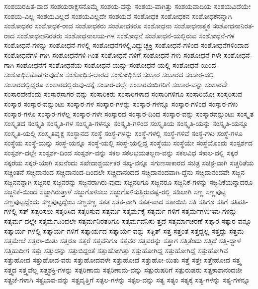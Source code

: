 {ಸಂಶಯರಹಿತ-ವಾದ
ಸಂಶಯರಾಕ್ಷಸನೊಮ್ಮೆ
ಸಂಶಯ-ವನ್ನು
ಸಂಶಯ-ವಾಗಿತ್ತು
ಸಂಶಯವಾದಿಯ
ಸಂಶಯವಿದೆಯೇ
ಸಂಶಯ-ವಿಲ್ಲ
ಸಂಶಯವಿಲ್ಲದೆ
ಸಂಶಯವಿಲ್ಲದೇ
ಸಂಶಯವೆ
ಸಂಶೋಧಕ
ಸಂಶೋಧಕನ
ಸಂಶೋಧಕನನ್ನಾಗಿ
ಸಂಶೋಧಕರ
ಸಂಶೋಧಕ-ರಾದ
ಸಂಶೋಧಕರು
ಸಂಶೋಧಕರೂ
ಸಂಶೋಧನಾ
ಸಂಶೋಧನಾತ್ಮಕ
ಸಂಶೋಧನಾನಿರತ-ರಾದ
ಸಂಶೋಧನಾನಿರತರು
ಸಂಶೋಧನಾಲಯ-ಗಳ
ಸಂಶೋಧನೆ
ಸಂಶೋಧನೆ-ಯಲ್ಲಿರುವ
ಸಂಶೋಧನೆ-ಗಳ
ಸಂಶೋಧನೆ-ಗಳನ್ನು
ಸಂಶೋಧನೆ-ಗಳಲ್ಲಿ
ಸಂಶೋಧನೆಗಳಲ್ಲಿವಿದ್ಯುಚ್ಛಕ್ತಿ
ಸಂಶೋಧನೆ-ಗಳಿಂದ
ಸಂಶೋಧನೆಗಳಿಂದಾದ
ಸಂಶೋಧನೆಗಳಿ-ಗಾಗಿ
ಸಂಶೋಧನೆಗಳಿ-ಗಿಂತ
ಸಂಶೋಧನೆ-ಗಳಿಗೆ
ಸಂಶೋಧನೆ-ಗಳು
ಸಂಶೋಧನೆ-ಗಳೇ
ಸಂಶೋಧನೆ-ಗಾಗಿ
ಸಂಶೋಧನೆಗೆ
ಸಂಶೋಧನೆಯ
ಸಂಶೋಧನೆ-ಯನ್ನು
ಸಂಶೋಧನೆ-ಯಲ್ಲಿ
ಸಂಶೋಧನೆ-ಯಿಂದ
ಸಂಶೋಧಿಸತೊಡಗುವುದೊ
ಸಂಶೋಧಿಸ-ಲಾರದ
ಸಂಶೋಧಿಸಿದ
ಸಂಸಾರ
ಸಂಸಾರದ
ಸಂಸಾರ-ದಲ್ಲಿ
ಸಂಸಾರದಲ್ಲಿದ್ದರೂ
ಸಂಸಾರದಲ್ಲಿರುವು-ದಕ್ಕೆ
ಸಂಸಾರ-ದಲ್ಲೇ
ಸಂಸಾರವಂದಿಗರಿಗೆ
ಸಂಸಾರ-ವನ್ನು
ಸಂಸಾರವೇ
ಸಂಸಾರವೇನೆಂದು
ಸಂಸಾರಸಾಗರ-ವನ್ನು
ಸಂಸಾರಿಕರು
ಸಂಸಾರಿಗಳಾದ
ಸಂಸಾರಿಗಳಿಗೂ
ಸಂಸಾರಿಯೋ
ಸಂಸ್ಕರಿಸುವ
ಸಂಸ್ಕಾರ
ಸಂಸ್ಕಾರ-ವನ್ನುಂಟು
ಸಂಸ್ಕಾರ-ಗಳ
ಸಂಸ್ಕಾರ-ಗಳನ್ನು
ಸಂಸ್ಕಾರ-ಗಳನ್ನೂ
ಸಂಸ್ಕಾರ-ಗಳಿಂದ
ಸಂಸ್ಕಾರ-ಗಳು
ಸಂಸ್ಕಾರ-ಗಳೂ
ಸಂಸ್ಕಾರ-ಗಳೆಲ್ಲ
ಸಂಸ್ಕಾರ-ಗಳೇ
ಸಂಸ್ಕಾರದ
ಸಂಸ್ಕಾರ-ದಿಂದ
ಸಂಸ್ಕಾರ-ವನ್ನು
ಸಂಸ್ಕಾರವನ್ನುಂಟು
ಸಂಸ್ಕೃತ
ಸಂಸ್ಕೃತದ
ಸಂಸ್ಕೃತಿ
ಸಂಸ್ಕೃತಿ-ಗಳ
ಸಂಸ್ಕೃತಿ-ಗಳನ್ನೂ
ಸಂಸ್ಕೃತಿ-ಗಳಿಂದ
ಸಂಸ್ಕೃತಿಯ
ಸಂಸ್ಕೃತಿ-ಯನ್ನು
ಸಂಸ್ಕೃತಿ-ಯನ್ನೂ
ಸಂಸ್ಕೃತಿ-ಯಲ್ಲಿ
ಸಂಸ್ಕೃತಿವೃಕ್ಷ
ಸಂಸ್ಥಾನದ
ಸಂಸ್ಥೆ
ಸಂಸ್ಥೆ-ಗಳನ್ನು
ಸಂಸ್ಥೆ-ಗಳಲ್ಲಿ
ಸಂಸ್ಥೆ-ಗಳಿವೆ
ಸಂಸ್ಥೆ-ಗಳು
ಸಂಸ್ಥೆ-ಗಳೂ
ಸಂಸ್ಥೆಯ
ಸಂಸ್ಥೆ-ಯನ್ನು
ಸಂಸ್ಥೆ-ಯನ್ನೂ
ಸಂಸ್ಥೆ-ಯಲ್ಲಿ
ಸಂಸ್ಥೆ-ಯಲ್ಲಿದ್ದ
ಸಂಸ್ಥೆಯು
ಸಂಸ್ಥೆಯೇ
ಸಂಸ್ಥೆಯೊಂದು
ಸಂಸ್ಪರ್ಶದ
ಸಂಸ್ಪರ್ಶ-ದಲ್ಲೇ
ಸಂಸ್ಪರ್ಶ-ದಿಂದ
ಸಂಸ್ಪರ್ಶ-ವನ್ನು
ಸಕಲ
ಸಕಲಭಯತಲ್ಲಣ-ವನ್ನು
ಸಕಲವಿಧ
ಸಕಾಲ-ದಲ್ಲಿ
ಸಕ್ಕರೆ
ಸಕ್ಕರೆಯ
ಸಕ್ಕರೆ-ಯಾಗಿ
ಸಖನೆಂದು
ಸಖೇದಾಶ್ಚರ್ಯಕರ
ಸಖ್ಯ-ವನ್ನೂ
ಸಗುಣಸಾಕಾರದ
ಸಚಿತ್ರ
ಸಚಿತ್ರ-ವಾಗಿ
ಸಚ್ಚರಿತೆಯ
ಸಚ್ಚಿಂತನೆ
ಸಚ್ಚಿದಾನಂದ
ಸಚ್ಚಿದಾನಂದ-ದಿಂದಲೇ
ಸಚ್ಚಿದಾನಂದದ
ಸಚ್ಚಿದಾನಂದವಾಗಿ-ದ್ದೆನು
ಸಚ್ಚಿದಾನಂದವೇ
ಸಜ್ಜನ
ಸಜ್ಜನನನ್ನಾಗಿ
ಸಜ್ಜನರ
ಸಜ್ಜನರನ್ನು
ಸಜ್ಜನರಾಗಿರು-ವುದು
ಸಜ್ಜನರಿಗೂ
ಸಜ್ಜನರೂ
ಸಜ್ಜನಿಕೆ-ಗಳನ್ನು
ಸಜ್ಜನಿಕೆಯನ್ನಾದರೂ
ಸಜ್ಜನಿಕೆ-ಯಿಂದ
ಸಜ್ಜಾಗಿರುತ್ತಾಳೆ
ಸಜ್ಜುಗೊಳಿಸಲು
ಸಜ್ಜುಗೊಳಿಸುತ್ತಿರುವಷ್ಟ-ರಲ್ಲಿ
ಸಡಿಲಾಗಿ
ಸಣ್ಣ
ಸಣ್ಣಪುಟ್ಟ
ಸಣ್ಣಪುಟ್ಟದ್ದೆಂದು
ಸಣ್ಣಪುಟ್ಟದ್ದೆಂಬ
ಸಣ್ಣಸಣ್ಣ
ಸತತ
ಸತತ-ವಾಗಿ
ಸತತ-ವಾದ
ಸತಾಯಿಸಿ
ಸತಿ
ಸತಿಗೂ
ಸತಿಗೆ
ಸತಿಪತಿ-ಗಳಲ್ಲಿ
ಸತ್
ಸತ್ಕರಿಸಲು
ಸತ್ಕರಿಸಿದ
ಸತ್ಕರಿಸುವ
ಸತ್ಕರ್ಮ
ಸತ್ಕರ್ಮಕ್ಕೆ
ಸತ್ಕರ್ಮ-ಗಳಿಗೆ
ಸತ್ಕರ್ಮಗಳುಇವು-ಗಳನ್ನು
ಸತ್ಕರ್ಮ-ದಲ್ಲೇ
ಸತ್ಕರ್ಮದಿಂದಲೇ
ಸತ್ಕರ್ಮನಿರತರಿಗೂ
ಸತ್ಕರ್ಮವೆನಿಸು-ತ್ತದೆ
ಸತ್ಕರ್ಮಾಚರಣೆ
ಸತ್ಕಾರ
ಸತ್ಕಾರ-ವನ್ನೂ
ಸತ್ಕಾರ್ಯ-ಗಳಲ್ಲಿ
ಸತ್ಕಾರ್ಯ-ಗಳಿಗೆ
ಸತ್ಕಾರ್ಯದ
ಸತ್ಕಾರ್ಯ-ವನ್ನು
ಸತ್ಚಿತ್
ಸತ್ತ
ಸತ್ತಂತೆ
ಸತ್ತದ್ದಲ್ಲ
ಸತ್ತದ್ದು
ಸತ್ತಮ
ಸತ್ತಮೇಲೆ
ಸತ್ತರಾ-ಯಿತು
ಸತ್ತರೂ
ಸತ್ತರೆ
ಸತ್ತವನಿಗೂ
ಸತ್ತವರ
ಸತ್ತವರನ್ನು
ಸತ್ತಾಗ
ಸತ್ತಿತೆಂದು
ಸತ್ತಿದೆ
ಸತ್ತಿ-ದ್ದಾಳೆ
ಸತ್ತಿಹುದೀಗ
ಸತ್ತು
ಸತ್ತುದನ್ನು
ಸತ್ತುಬಿದ್ದಂತೆ
ಸತ್ತುಹೋಗಿತ್ತು
ಸತ್ತುಹೋಗಿದ್ದ
ಸತ್ತುಹೋಗಿದ್ದೆ
ಸತ್ತುಹೋಗಿವೆ
ಸತ್ತುಹೋದ
ಸತ್ತುಹೋದ-ವರು
ಸತ್ತುಹೋದವಳೇ
ಸತ್ತುಹೋದೆ
ಸತ್ತುಹೋ-ಯಿತು
ಸತ್ತೆ
ಸತ್ತೇ
ಸತ್ತೇಹೋದ
ಸತ್ತ್ವ
ಸತ್ತ್ವದ
ಸತ್ತ್ವವೆಲ್ಲ
ಸತ್ತ್ವಶಕ್ತಿ-ಗಳನ್ನು
ಸತ್ಪರಿಣಾಮ
ಸತ್ಪರಿಣಾಮ-ವನ್ನು
ಸತ್ಪುರುಷರಿಗೆ
ಸತ್ಪುರುಷರು
ಸತ್ಪ್ರಕಾಶಾನಂದಜೀ
ಸತ್ಪ್ರಜೆ-ಗಳಾಗಿ
ಸತ್ಪ್ರಭಾವ-ವನ್ನು
ಸತ್ಪ್ರವೃತ್ತಿಗೆ
ಸತ್ಫಲ-ಗಳನ್ನು
ಸತ್ಫಲ-ವನ್ನು
ಸತ್ಯ
ಸತ್ಯಂ
ಸತ್ಯಕ್ಕೆ
ಸತ್ಯ-ಗಳನ್ನು
ಸತ್ಯ-ಗಳನ್ನೂ
}
